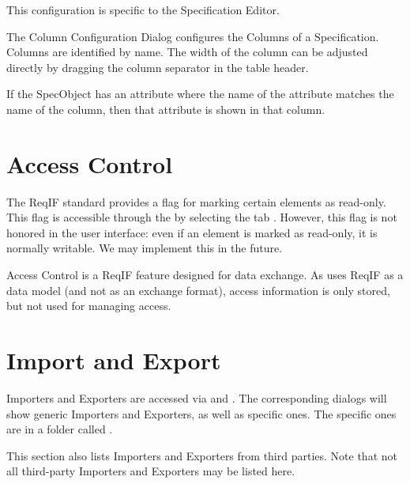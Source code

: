 This configuration is specific to the Specification Editor.

The Column Configuration Dialog configures the Columns of a
Specification.  Columns are identified by name.  The width of the column
can be adjusted directly by dragging the column separator in the table
header.

If the SpecObject has an attribute where the name of the attribute
matches the name of the column, then that attribute is shown in that
column.

\section{Access Control}

The ReqIF standard provides a flag for marking certain elements as read-only.  This flag is accessible through the  by selecting the tab .  However, this flag is not honored in the user interface: even if an element is marked as read-only, it is normally writable.  We may implement this in the future.

\begin{warning}
Access Control is a ReqIF feature designed for data exchange.  As \pror{} uses ReqIF as a data model (and not as an exchange format), access information is only stored, but not used for managing access.
\end{warning}

\section{Import and Export}

Importers and Exporters are accessed via  and .  The corresponding dialogs will show generic Importers and Exporters, as well as specific ones.  The specific ones are in a folder called .

This section also lists Importers and Exporters from third parties. Note that not all third-party Importers and Exporters may be listed here.

